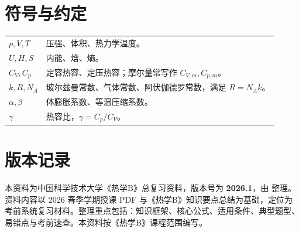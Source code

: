 \documentclass[UTF8,fontset=fandol,zihao=-4,openany,oneside]{ctexbook}
\begin{document}
\frontmatter
\makecoursecover

\tableofcontents

\mainmatter









\appendix

\chapter{符号与约定}

\begin{FormulaBox}[常用符号]
\begin{tabularx}{\textwidth}{@{}>{\bfseries}lX@{}}
\(p,V,T\) & 压强、体积、热力学温度。\\
\(U,H,S\) & 内能、焓、熵。\\
\(C_V,C_p\) & 定容热容、定压热容；摩尔量常写作 \(C_{V,m},C_{p,m}\)。\\
\(k,R,N_A\) & 玻尔兹曼常数、气体常数、阿伏伽德罗常数，满足 \(R=N_A k\)。\\
\(\alpha,\beta\) & 体膨胀系数、等温压缩系数。\\
\(\gamma\) & 热容比，\(\gamma=C_p/C_V\)。\\
\end{tabularx}
\end{FormulaBox}

\backmatter

\chapter*{版本记录}

\begin{SourceBox}[版本说明]
本资料为中国科学技术大学《热学B》总复习资料，版本号为 \textbf{2026.1}，由 \textbf{\DocAuthor} 整理。资料内容以 2026 春季学期授课 PDF 与《热学B》知识要点总结为基础，定位为考前系统复习材料。整理重点包括：知识框架、核心公式、适用条件、典型题型、易错点与考前速查。本资料按《热学B》课程范围编写。
\end{SourceBox}
\end{document}

